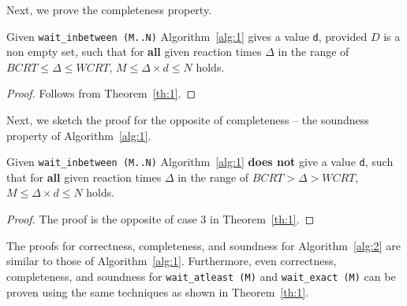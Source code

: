 Next, we prove the completeness property.
\begin{theorem}
  Given \texttt{wait\_inbetween (M..N)} Algorithm~\ref{alg:1} gives a
  value \texttt{d}, provided $D$ is a non empty set, such that for
  \textbf{all} given reaction times $\Delta$ in the range of $BCRT \leq
  \Delta \leq WCRT$, $M \leq \Delta \times d \leq N$ holds.
\end{theorem}
\begin{proof}
  Follows from Theorem~\ref{th:1}.
\end{proof}

Next, we sketch the proof for the opposite of completeness -- the
soundness property of Algorithm~\ref{alg:1}.

\begin{theorem}
  Given \texttt{wait\_inbetween (M..N)} Algorithm~\ref{alg:1}
  \textbf{does not} give a value \texttt{d}, such that for \textbf{all}
  given reaction times $\Delta$ in the range of $BCRT > \Delta > WCRT$,
  $M \leq \Delta \times d \leq N$ holds.
\end{theorem}

\begin{proof}
  The proof is the opposite of case 3 in Theorem~\ref{th:1}.
\end{proof}

The proofs for correctness, completeness, and soundness for
Algorithm~\ref{alg:2} are similar to those of
Algorithm~\ref{alg:1}. Furthermore, even correctness, completeness, and
soundness for \texttt{wait\_atleast (M)} and \texttt{wait\_exact (M)}
can be proven using the same techniques as shown in Theorem~\ref{th:1}.

